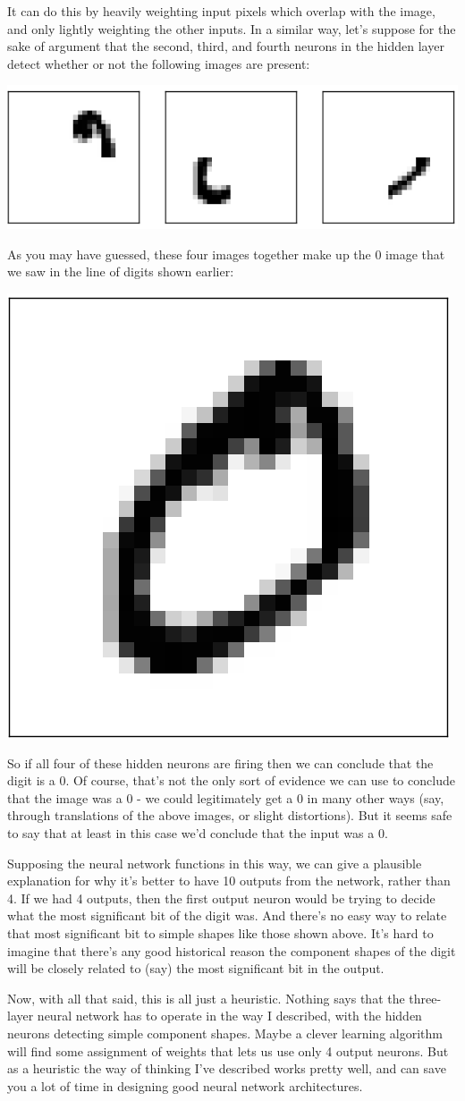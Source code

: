 \documentclass[a4paper,twoside,10pt]{book}
\begin{document}
It can do this by heavily weighting input pixels which overlap with the image, and only lightly weighting the other inputs. In a similar way, let's suppose for the sake of argument that the second, third, and fourth neurons in the hidden layer detect whether or not the following images are present:
\begin{center}
	\includegraphics[height=0.1\linewidth]{./figures/ch1/mnist_other_features}
\end{center}
As you may have guessed, these four images together make up the 0 image that we saw in the line of digits shown earlier:
\begin{center}
	\includegraphics[height=0.1\linewidth]{./figures/ch1/mnist_complete_zero}
\end{center}
So if all four of these hidden neurons are firing then we can conclude that the digit is a 0. Of course, that's not the only sort of evidence we can use to conclude that the image was a 0 - we could legitimately get a 0 in many other ways (say, through translations of the above images, or slight distortions). But it seems safe to say that at least in this case we'd conclude that the input was a 0.

Supposing the neural network functions in this way, we can give a plausible explanation for why it's better to have 10 outputs from the network, rather than 4. If we had 4 outputs, then the first output neuron would be trying to decide what the most significant bit of the digit was. And there's no easy way to relate that most significant bit to simple shapes like those shown above. It's hard to imagine that there's any good historical reason the component shapes of the digit will be closely related to (say) the most significant bit in the output.

Now, with all that said, this is all just a heuristic. Nothing says that the three-layer neural network has to operate in the way I described, with the hidden neurons detecting simple component shapes. Maybe a clever learning algorithm will find some assignment of weights that lets us use only 4 output neurons. But as a heuristic the way of thinking I've described works pretty well, and can save you a lot of time in designing good neural network architectures.
\end{document}
